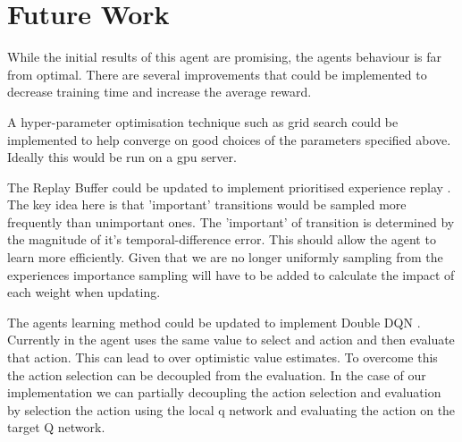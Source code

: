\documentclass[12pt]{article}
\begin{document}
\section{Future Work}
While the initial results of this agent are promising, the agents behaviour is far from optimal.
There are several improvements that could be implemented to decrease training time and increase the average reward.

A hyper-parameter optimisation technique such as grid search could be implemented to help converge on good choices of the parameters 
specified above. Ideally this would be run on a gpu server.

The Replay Buffer could be updated to implement prioritised experience replay \cite{per_paper}. 
The key idea here is that 'important' transitions would be sampled more frequently than unimportant ones. 
The 'important' of transition is determined by the magnitude of it's temporal-difference error.
This should allow the agent to learn more efficiently. 
Given that we are no longer uniformly sampling from the experiences importance sampling will have to be added to calculate the impact of each weight when updating.

The agents learning method could be updated to implement Double DQN \cite{ddqn_paper}. 
Currently in the agent uses the same value to select and action and then evaluate that action.
This can lead to over optimistic value estimates.
To overcome this the action selection can be decoupled from the evaluation.
In the case of our implementation we can partially decoupling the action selection and evaluation by selection the action using the local q network and evaluating the action on the target Q network.


\printbibliography
\end{document}

